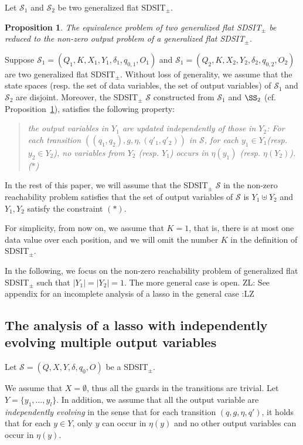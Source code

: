 \documentclass[11pt]{article}
\newtheorem{proposition}[theorem]{Proposition}
\def\Ss{{\mathcal{S} }}
\newcommand{\zhilin}[1]{\color{cyan} {ZL: #1 :LZ} \color{black}}
\begin{document}
Let $\Ss_1$ and $\Ss_2$ be two generalized flat SDSIT$_{\pm}$.

\begin{proposition}\label{prop-equiv-reduce}
The equivalence problem of two generalized flat SDSIT$_{\pm}$ be reduced to the non-zero output problem of a generalized flat SDSIT$_{\pm}$.
\end{proposition}

Suppose $\Ss_1=(Q_1, K, X_1, Y_1, \delta_1, q_{0,1}, O_1)$ and $\Ss_1=(Q_2, K, X_2, Y_2, \delta_2, q_{0,2}, O_2)$ are two generalized flat SDSIT$_{\pm}$. Without loss of generality, we assume that the state spaces (resp. the set of data variables, the set of output variables) of $\Ss_1$ and $\Ss_2$ are disjoint. Moreover, the SDSIT$_{\pm}$ $\Ss$ constructed from $\Ss_1$ and $\SS_2$ (cf. Proposition~\ref{prop-equiv-reduce}), satisfies the following property: 
\begin{quote}
\it the output variables in $Y_1$ are updated independently of those in $Y_2$: For each transition $((q_1,q_2),g,\eta,(q'_1,q'_2))$ in $\Ss$, for each $y_1 \in Y_1$(resp. $y_2 \in Y_2$), no variables from $Y_2$ (resp. $Y_1$) occurs in $\eta(y_1)$ (resp. $\eta(Y_2)$). \hfill ($\ast$)
\end{quote}

In the rest of this paper, we will assume that the SDSIT$_{\pm}$ $\Ss$ in the non-zero reachability problem satisfies that the set of output variables of $\Ss$ is $Y_1 \uplus Y_2$ and $Y_1,Y_2$ satisfy the constraint $(\ast)$.

For simplicity, from now on, we assume that $K=1$, that is, there is at most one data value over each position, and we will omit the number $K$ in the definition of SDSIT$_{\pm}$.

In the following, we focus on the non-zero reachability problem of generalized flat SDSIT$_{\pm}$ such that $|Y_1| = |Y_2|=1$. The more general case is open. \zhilin{See appendix for an incomplete analysis of a lasso in the general case}


\subsection{The analysis of a lasso with independently evolving multiple output variables}

Let $\Ss=(Q, X, Y, \delta, q_0, O)$ be a SDSIT$_{\pm}$. 

We assume that $X=\emptyset$, thus all the guards in the transitions are trivial. Let $Y=\{y_1,\dots,y_l\}$. In addition, we assume that all the output variable are \emph{independently evolving} in the sense that for each transition $(q,g, \eta, q')$, it holds that for each $y \in Y$, only $y$ can occur in $\eta(y)$ and no other output variables can occur in $\eta(y)$. 
\end{document}
